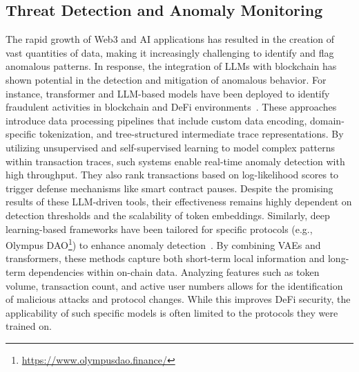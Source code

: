 \documentclass[5p,twocolumn]{elsarticle}
\begin{document}
\subsection{Threat Detection and Anomaly Monitoring}
The rapid growth of Web3 and AI applications has resulted in the creation of vast quantities of data, making it increasingly challenging to identify and flag anomalous patterns. In response, the integration of LLMs with blockchain has shown potential in the detection and mitigation of anomalous behavior. For instance, transformer and LLM-based models have been deployed to identify fraudulent activities in blockchain and DeFi environments~\cite{gai2023blockchain}. These approaches introduce data processing pipelines that include custom data encoding, domain-specific tokenization, and tree-structured intermediate trace representations. By utilizing unsupervised and self-supervised learning to model complex patterns within transaction traces, such systems enable real-time anomaly detection with high throughput. They also rank transactions based on log-likelihood scores to trigger defense mechanisms like smart contract pauses. Despite the promising results of these LLM-driven tools, their effectiveness remains highly dependent on detection thresholds and the scalability of token embeddings. Similarly, deep learning-based frameworks have been tailored for specific protocols (e.g., Olympus DAO\footnote{\url{https://www.olympusdao.finance/}}) to enhance anomaly detection~\cite{song2023anomaly}. By combining VAEs and transformers, these methods capture both short-term local information and long-term dependencies within on-chain data. Analyzing features such as token volume, transaction count, and active user numbers allows for the identification of malicious attacks and protocol changes. While this improves DeFi security, the applicability of such specific models is often limited to the protocols they were trained on.
\end{document}
